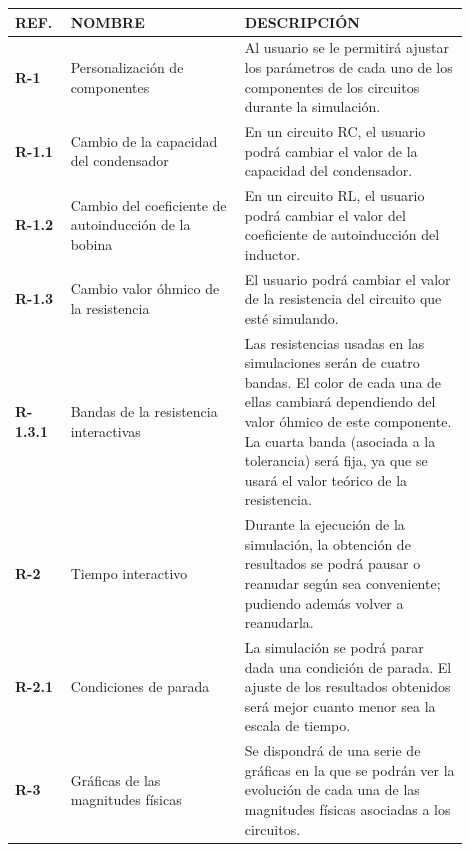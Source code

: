 \documentclass[../main.tex]{subfiles}
\begin{document}
\begin{longtable}{|| p{0.1\linewidth} | p{0.35\linewidth} |  p{0.45\linewidth} ||}
            \hline
            \textbf{REF.} & \textbf{NOMBRE} & \textbf{DESCRIPCIÓN} \\ \hline
           
            \textbf{R-1} & Personalización de componentes & Al usuario se le permitirá ajustar los parámetros de cada uno de los componentes de los circuitos durante la simulación. \\ \hline
            
            \textbf{R-1.1} & Cambio de la capacidad del condensador & En un circuito RC, el usuario podrá cambiar el valor de la capacidad del condensador. \\ \hline
            
            \textbf{R-1.2} & Cambio del coeficiente de autoinducción de la bobina & En un circuito RL, el usuario podrá cambiar el valor del coeficiente de autoinducción del inductor.  \\ \hline
        
            \textbf{R-1.3} & Cambio valor óhmico de la resistencia & El usuario podrá cambiar el valor de la resistencia del circuito que esté simulando. \\ \hline
            
            \textbf{R-1.3.1} & Bandas de la resistencia interactivas & Las resistencias usadas en las simulaciones serán de cuatro bandas. El color de cada una de ellas cambiará dependiendo del valor óhmico de este componente. La cuarta banda (asociada a la tolerancia) será fija, ya que se usará el valor teórico de la resistencia. \\ \hline
            
            \textbf{R-2} & Tiempo interactivo & Durante la ejecución de la simulación, la obtención de resultados se podrá pausar o reanudar según sea conveniente; pudiendo además volver a reanudarla. \\ \hline
            
            \textbf{R-2.1} & Condiciones de parada & La simulación se podrá parar dada una condición de parada. El ajuste de los resultados obtenidos será mejor cuanto menor sea la escala de tiempo. \\ \hline
            
            \textbf{R-3} & Gráficas de las magnitudes físicas & Se dispondrá de una serie de gráficas en la que se podrán ver la evolución de cada una de las magnitudes físicas asociadas a los circuitos. \\ \hline
            

\end{longtable}
\end{document}
